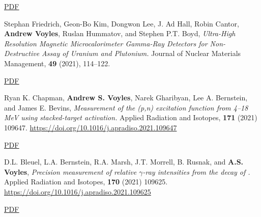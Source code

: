 \begin{bibsection}
\ifshort \vspace{0.1cm} \href{https://avoyles.github.io/papers/Fox2021_As.pdf}{\underline{PDF}} \else  \fi 


\item Stephan Friedrich, Geon-Bo Kim, Dongwon Lee, J. Ad Hall, Robin Cantor, \textbf{Andrew Voyles}, Ruslan Hummatov, and Stephen P.T. Boyd, \emph{Ultra-High Resolution Magnetic Microcalorimeter Gamma-Ray Detectors for Non-Destructive Assay of Uranium and Plutonium.} Journal of Nuclear Materials Management, \textbf{49} (2021), 114--122. 

\ifshort \vspace{0.1cm} \href{https://avoyles.github.io/papers/Friedrich2021_MMC.pdf}{\underline{PDF}} \else  \fi 








\item Ryan K. Chapman, \textbf{Andrew S. Voyles}, Narek Gharibyan, Lee A. Bernstein, and
James E. Bevins, \emph{Measurement of the (p,n) excitation function from 4--18 MeV using stacked-target activation.} Applied Radiation and Isotopes, \textbf{171} (2021) 109647.  \url{https://doi.org/10.1016/j.apradiso.2021.109647} 

\ifshort \vspace{0.1cm} \href{https://avoyles.github.io/papers/Chapman2021_160Tb.pdf}{\underline{PDF}} \else  \fi 


\item D.L. Bleuel, L.A. Bernstein, R.A. Marsh, J.T. Morrell, B. Rusnak, and \textbf{A.S. Voyles},  \emph{Precision measurement of relative $\gamma$-ray intensities from the decay of .} Applied Radiation and Isotopes, \textbf{170} (2021) 109625. \url{https://doi.org/10.1016/j.apradiso.2021.109625} 

\ifshort \vspace{0.1cm} \href{https://avoyles.github.io/papers/Bleuel2021_61Cu.pdf}{\underline{PDF}} \else  \fi 


\end{bibsection}
